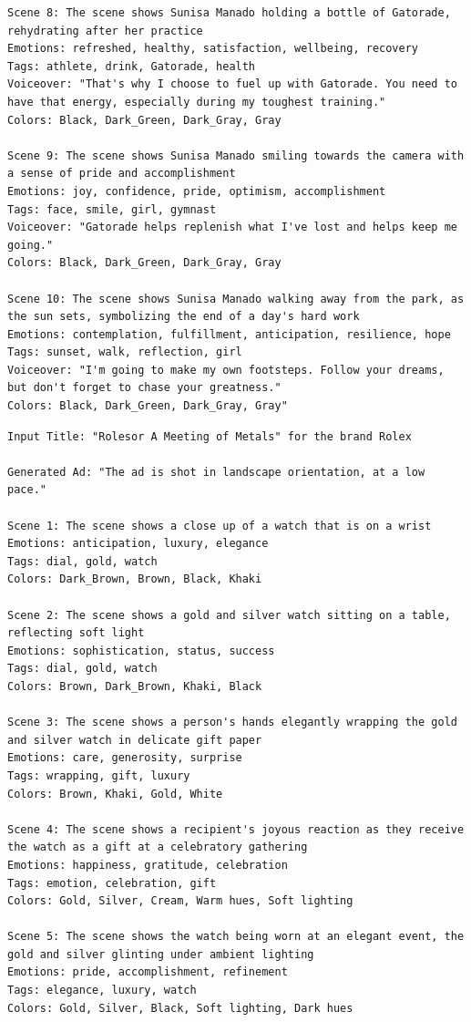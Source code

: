 \begin{lstlisting}[caption={Advertisement generated by Henry-SEED for an Gatorade ad. Original Ad: \url{https://www.youtube.com/watch?v=BKPQkjRF4yY}},frame=single,breaklines=true,basicstyle=\tiny, label={lst:gatorade}]
Scene 8: The scene shows Sunisa Manado holding a bottle of Gatorade, rehydrating after her practice
Emotions: refreshed, healthy, satisfaction, wellbeing, recovery
Tags: athlete, drink, Gatorade, health
Voiceover: "That's why I choose to fuel up with Gatorade. You need to have that energy, especially during my toughest training."
Colors: Black, Dark_Green, Dark_Gray, Gray

Scene 9: The scene shows Sunisa Manado smiling towards the camera with a sense of pride and accomplishment
Emotions: joy, confidence, pride, optimism, accomplishment
Tags: face, smile, girl, gymnast
Voiceover: "Gatorade helps replenish what I've lost and helps keep me going."
Colors: Black, Dark_Green, Dark_Gray, Gray

Scene 10: The scene shows Sunisa Manado walking away from the park, as the sun sets, symbolizing the end of a day's hard work
Emotions: contemplation, fulfillment, anticipation, resilience, hope
Tags: sunset, walk, reflection, girl
Voiceover: "I'm going to make my own footsteps. Follow your dreams, but don't forget to chase your greatness."
Colors: Black, Dark_Green, Dark_Gray, Gray"
\end{lstlisting}


\begin{lstlisting}[caption={Advertisement generated by Henry-SEED for a Rolex ad. Original Ad: \url{https://www.youtube.com/watch?v=vA-Lxmh1MdQ}},frame=single,breaklines=true,basicstyle=\tiny, label={lst:rolex}]
Input Title: "Rolesor A Meeting of Metals" for the brand Rolex

Generated Ad: "The ad is shot in landscape orientation, at a low pace."

Scene 1: The scene shows a close up of a watch that is on a wrist
Emotions: anticipation, luxury, elegance
Tags: dial, gold, watch
Colors: Dark_Brown, Brown, Black, Khaki

Scene 2: The scene shows a gold and silver watch sitting on a table, reflecting soft light
Emotions: sophistication, status, success
Tags: dial, gold, watch
Colors: Brown, Dark_Brown, Khaki, Black

Scene 3: The scene shows a person's hands elegantly wrapping the gold and silver watch in delicate gift paper
Emotions: care, generosity, surprise
Tags: wrapping, gift, luxury
Colors: Brown, Khaki, Gold, White

Scene 4: The scene shows a recipient's joyous reaction as they receive the watch as a gift at a celebratory gathering
Emotions: happiness, gratitude, celebration
Tags: emotion, celebration, gift
Colors: Gold, Silver, Cream, Warm hues, Soft lighting

Scene 5: The scene shows the watch being worn at an elegant event, the gold and silver glinting under ambient lighting
Emotions: pride, accomplishment, refinement
Tags: elegance, luxury, watch
Colors: Gold, Silver, Black, Soft lighting, Dark hues
\end{lstlisting}

